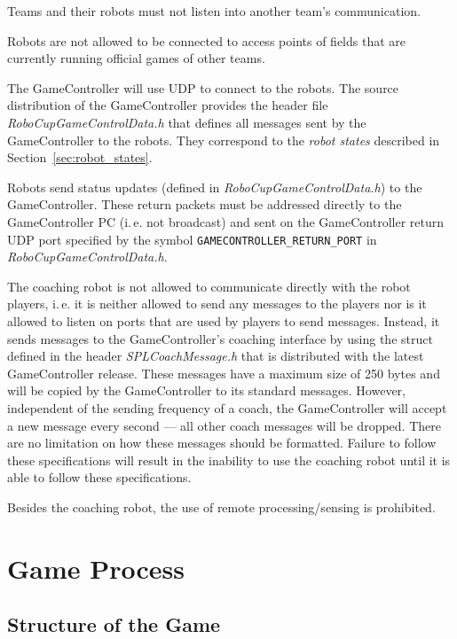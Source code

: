 \documentclass[12pt]{article}
\newcommand{\ie}{\mbox{i.\,e.}\xspace}
\begin{document}
Teams and their robots must not listen into another team's communication.

Robots are not allowed to be connected to access points of fields that are currently running official games of other teams.

The GameController will use UDP to connect to the robots. The source distribution of the GameController provides the header file \emph{RoboCupGameControlData.h} that defines all messages sent by the GameController to the robots. They correspond to the \emph{robot states} described in Section~\ref{sec:robot_states}.

Robots send status updates (defined in \emph{RoboCupGameControlData.h}) to the GameController. These return packets must be addressed directly to the GameController PC (\ie not broadcast) and sent on the GameController return UDP port specified by the symbol \verb!GAMECONTROLLER_RETURN_PORT! in \emph{RoboCupGameControlData.h}.

The coaching robot is not allowed to communicate directly with the robot players, \ie it is neither allowed to send any messages to the players nor is it allowed to listen on ports that are used by players to send messages. Instead, it sends messages to the GameController's coaching interface by using the struct defined in the header \emph{SPLCoachMessage.h} that is distributed with the latest GameController release. These messages have a maximum size of 250 bytes and will be copied by the GameController to its standard messages. However, independent of the sending frequency of a coach, the GameController will accept a new message every second --- all other coach messages will be dropped. There are no limitation on how these messages should be formatted.  Failure to follow these specifications will result in the inability to use the coaching robot until it is able to follow these specifications.

Besides the coaching robot, the use of remote processing/sensing is prohibited.


\newpage


\section{Game Process}
\label{sec:game_process}

\subsection{Structure of the Game}
\label{sec:game_struct}
\end{document}

